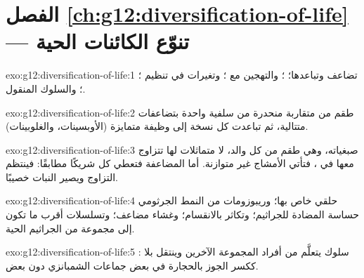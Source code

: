 \section*{الفصل \ref{ch:g12:diversification-of-life} --- تنوّع الكائنات الحية}

\begin{solution}{exo:g12:diversification-of-life:1}
تضاعف  وتباعدها؛ ؛ والتهجين مع ؛ وتغيرات في تنظيم ؛ ؛ والسلوك
المنقول.
\end{solution}

\begin{solution}{exo:g12:diversification-of-life:2}
طقم من  متقاربة منحدرة من  سلفية واحدة بتضاعفات متتالية،
ثم تباعدت كل نسخة  إلى وظيفة متمايزة (الأوبسينات،
والغلوبينات).
\end{solution}

\begin{solution}{exo:g12:diversification-of-life:3}
صبغياته، وهي طقم من كل  والد، لا متماثلات لها تتزاوج معها في
، فتأتي الأمشاج غير متوازنة. أما المضاعفة فتعطي كل
 شريكًا مطابقًا: فينتظم التزاوج  ويصير النبات
خصيبًا.
\end{solution}

\begin{solution}{exo:g12:diversification-of-life:4}
 حلقي خاص بها؛ وريبوزومات من النمط الجرثومي حساسة 
المضادة للجراثيم؛ وتكاثر بالانقسام؛ وغشاء مضاعف؛ وتسلسلات أقرب ما
تكون إلى مجموعة من الجراثيم الحية.
\end{solution}

\begin{solution}{exo:g12:diversification-of-life:5}
سلوك يتعلَّم من أفراد المجموعة الآخرين وينتقل بلا : ككسر الجوز
بالحجارة في بعض جماعات الشمبانزي دون بعض.
\end{solution}

